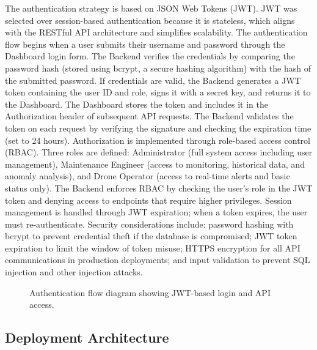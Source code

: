 The authentication strategy is based on JSON Web Tokens (JWT). JWT was selected over session-based authentication because it is stateless, which aligns with the RESTful API architecture and simplifies scalability. The authentication flow begins when a user submits their username and password through the Dashboard login form. The Backend verifies the credentials by comparing the password hash (stored using bcrypt, a secure hashing algorithm) with the hash of the submitted password. If credentials are valid, the Backend generates a JWT token containing the user ID and role, signs it with a secret key, and returns it to the Dashboard. The Dashboard stores the token and includes it in the Authorization header of subsequent API requests. The Backend validates the token on each request by verifying the signature and checking the expiration time (set to 24 hours). Authorization is implemented through role-based access control (RBAC). Three roles are defined: Administrator (full system access including user management), Maintenance Engineer (access to monitoring, historical data, and anomaly analysis), and Drone Operator (access to real-time alerts and basic status only). The Backend enforces RBAC by checking the user's role in the JWT token and denying access to endpoints that require higher privileges. Session management is handled through JWT expiration; when a token expires, the user must re-authenticate. Security considerations include: password hashing with bcrypt to prevent credential theft if the database is compromised; JWT token expiration to limit the window of token misuse; HTTPS encryption for all API communications in production deployments; and input validation to prevent SQL injection and other injection attacks.

\begin{figure}[H]
\centering
\caption{Authentication flow diagram showing JWT-based login and API access.}
\label{fig:auth_flow}
\end{figure}

\subsection{Deployment Architecture}

